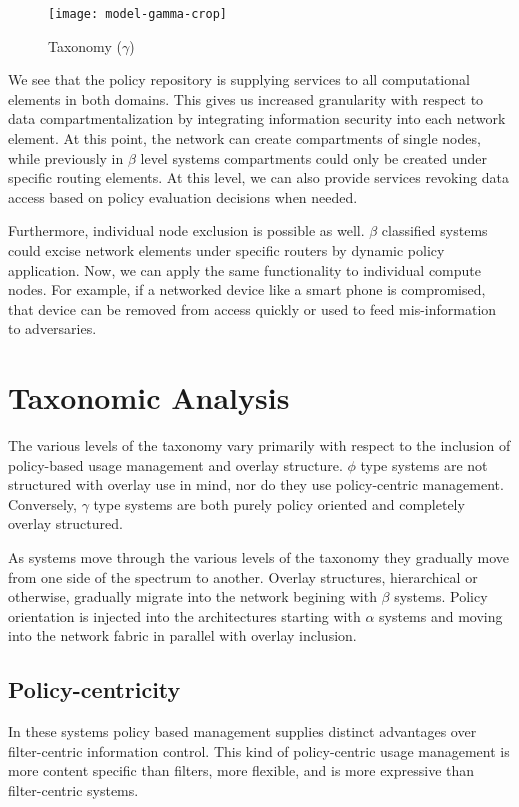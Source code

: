 \begin{figure}[!t]
\centering
\texttt{[image: model-gamma-crop]}
\caption{Taxonomy ($\gamma$)}
\label{fig:model:taxonomy-gamma}
\end{figure}

We see that the policy repository is supplying services to all computational elements in both domains.  This gives us increased granularity with respect to data compartmentalization by integrating information security into each network element.  At this point, the network can create compartments of single nodes, while previously in $\beta$ level systems compartments could only be created under specific routing elements.  At this level, we can also provide services revoking data access based on policy evaluation decisions when needed.

Furthermore, individual node exclusion is possible as well. $\beta$ classified systems could excise network elements under specific routers by dynamic policy application.  Now, we can apply the same functionality to individual compute nodes.  For example, if a networked device like a smart phone is compromised, that device can be removed from access quickly or used to feed mis-information to adversaries.

\section{Taxonomic Analysis}
The various levels of the taxonomy vary primarily with respect to the inclusion of policy-based usage management and overlay structure.  $\phi$ type systems are not structured with overlay use in mind, nor do they use policy-centric management.  Conversely, $\gamma$ type systems are both purely policy oriented and completely overlay structured.

As systems move through the various levels of the taxonomy they gradually move from one side of the spectrum to another.  Overlay structures, hierarchical or otherwise, gradually migrate into the network begining with $\beta$ systems.  Policy orientation is injected into the architectures starting with $\alpha$ systems and moving into the network fabric in parallel with overlay inclusion.

\subsection{Policy-centricity}
In these systems policy based management supplies distinct advantages over filter-centric information control.  This kind of policy-centric usage management is more content specific than filters, more flexible, and is more expressive than filter-centric systems.

